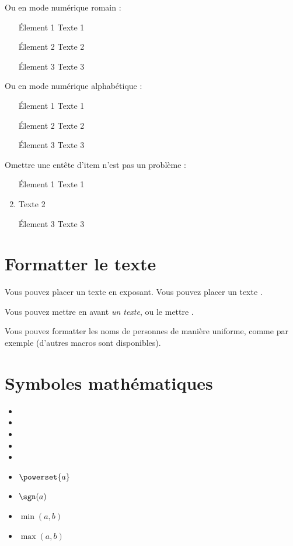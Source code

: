 \documentclass[french]{spimubephdthesis}
\begin{document}
Ou en mode numérique romain :
\begin{enumerate}[i]
\item[\'Element 1] Texte 1
\item[\'Element 2] Texte 2
\item[\'Element 3] Texte 3
\end{enumerate}

Ou en mode numérique alphabétique :
\begin{enumerate}[a]
\item[\'Element 1] Texte 1
\item[\'Element 2] Texte 2
\item[\'Element 3] Texte 3
\end{enumerate}

Omettre une entête d'item n'est pas un problème :
\begin{enumerate}
\item[\'Element 1] Texte 1
\item Texte 2
\item[\'Element 3] Texte 3
\end{enumerate}

\section{Formatter le texte}

Vous pouvez placer un texte \textup{en exposant}. Vous pouvez placer un texte .

Vous pouvez mettre en avant \emph{un texte}, ou le mettre .

Vous pouvez formatter les noms de personnes de manière uniforme, comme par exemple  (d'autres macros sont disponibles).

\section{Symboles mathématiques}

\begin{itemize}
\item \R
\item \N
\item \Z
\item \Q
\item \C
\item $\powerset{a}$
\item $\sgn(a)$
\item $\min(a, b)$
\item $\max(a, b)$
\end{itemize}
\end{document}
